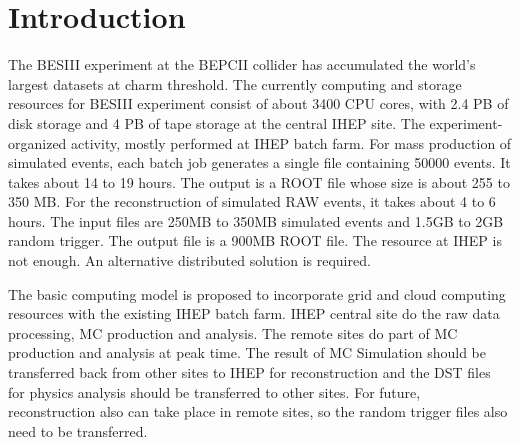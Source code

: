 \section{Introduction}
The BESIII experiment at the BEPCII collider has accumulated
the world's largest datasets at charm threshold.
%
The currently computing and storage resources for BESIII 
experiment consist of about 3400 CPU cores, with 2.4 PB of disk
storage and 4 PB of tape storage at the central IHEP site.
The experiment-organized activity, mostly performed at IHEP
batch farm. For mass production of simulated events,
each batch job generates a single file containing
50000 events. It takes about 14 to 19 hours. The output
is a ROOT file whose size is about 255 to 350 MB.
For the reconstruction of simulated RAW events,
it takes about 4 to 6 hours. The input files are
250MB to 350MB simulated events and 1.5GB to 2GB random trigger.
The output file is a 900MB ROOT file.
The resource at IHEP is not enough.
An alternative distributed solution is required.

The basic computing model is proposed to incorporate grid and
cloud computing resources with the existing IHEP batch farm.
IHEP central site do the raw data processing, MC production
and analysis. The remote sites do part of MC production
and analysis at peak time.
The result of MC Simulation should be transferred back
from other sites to IHEP for reconstruction
and the DST files for physics analysis should be transferred
to other sites. For future, reconstruction also can take place 
in remote sites, so the random trigger files also need to be 
transferred.

